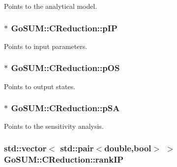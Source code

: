 Points to the analytical model. 

\hypertarget{class_go_s_u_m_1_1_c_reduction_a14167cf018ab466dbaa108c7fcf2c0f0}{
\subsubsection[{p\-I\-P}]{$\ast$ Go\-S\-U\-M\-::\-C\-Reduction\-::p\-I\-P\hspace{0.3cm}{\ttfamily [private]}}}\label{class_go_s_u_m_1_1_c_reduction_a14167cf018ab466dbaa108c7fcf2c0f0}


Points to input parameters. 

\hypertarget{class_go_s_u_m_1_1_c_reduction_a4cd38c6a79d17411f3345147ac6aa1da}{
\subsubsection[{p\-O\-S}]{$\ast$ Go\-S\-U\-M\-::\-C\-Reduction\-::p\-O\-S\hspace{0.3cm}{\ttfamily [private]}}}\label{class_go_s_u_m_1_1_c_reduction_a4cd38c6a79d17411f3345147ac6aa1da}


Points to output states. 

\hypertarget{class_go_s_u_m_1_1_c_reduction_a073798ed0b4c0323a2626e93556917e8}{
\subsubsection[{p\-S\-A}]{$\ast$ Go\-S\-U\-M\-::\-C\-Reduction\-::p\-S\-A\hspace{0.3cm}{\ttfamily [private]}}}\label{class_go_s_u_m_1_1_c_reduction_a073798ed0b4c0323a2626e93556917e8}


Points to the sensitivity analysis. 

\hypertarget{class_go_s_u_m_1_1_c_reduction_a819c0514f93b8384b5aea14d75669ddf}{
\subsubsection[{rank\-I\-P}]{\setlength{\rightskip}{0pt plus 5cm}std\-::vector$<$ std\-::pair$<$double,bool$>$ $>$ Go\-S\-U\-M\-::\-C\-Reduction\-::rank\-I\-P\hspace{0.3cm}{\ttfamily [private]}}}\label{class_go_s_u_m_1_1_c_reduction_a819c0514f93b8384b5aea14d75669ddf}


